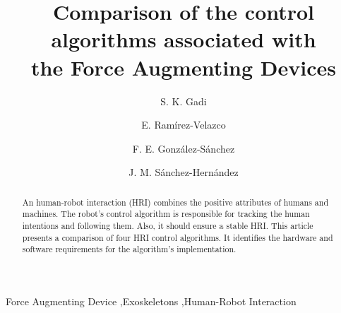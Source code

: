 \documentclass[preprint,12pt,3p]{elsarticle}
\begin{document}
\begin{frontmatter}
	
\title{Comparison of the control algorithms associated with\\the Force Augmenting Devices}
\author[FIME]{S. K. Gadi}
\address[FIME]{Facultad de Ingeniería Mecánica y Eléctrica, Universidad Autónoma de Coahuila, Torreón, Mexico.}
\author[ITA]{E. Ramírez-Velazco}
\address[ITA]{Departamento de Eléctrica-Electrónica, Instituto Tecnológico de Aguascalientes, Aguascalientes, Mexico.}
\author[FIME]{F. E. González-Sánchez}
\author[FIME]{J. M. Sánchez-Hernández}

\begin{abstract}
An human-robot interaction (HRI) combines the positive attributes of humans and machines. The robot's control algorithm is responsible for tracking the human intentions and following them. Also, it should ensure a stable HRI. This article presents a comparison of four  HRI control algorithms. It identifies the hardware and software requirements for the algorithm's implementation.
\end{abstract}

\begin{keyword}
Force Augmenting Device \sep Exoskeletons \sep Human-Robot Interaction
\end{keyword}
	
\end{frontmatter}
\end{document}
